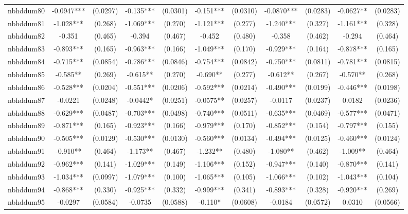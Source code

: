 \documentclass[]{article}
\begin{document}
\begin{tabular}{lcccccccccc}
nbhddum80 & -0.0947*** & (0.0297) & -0.135*** & (0.0301) & -0.151*** & (0.0310) & -0.0870*** & (0.0283) & -0.0627** & (0.0283) \\
nbhddum81 & -1.028*** & (0.268) & -1.069*** & (0.270) & -1.121*** & (0.277) & -1.240*** & (0.327) & -1.161*** & (0.328) \\
nbhddum82 & -0.351 & (0.465) & -0.394 & (0.467) & -0.452 & (0.480) & -0.358 & (0.462) & -0.294 & (0.464) \\
nbhddum83 & -0.893*** & (0.165) & -0.963*** & (0.166) & -1.049*** & (0.170) & -0.929*** & (0.164) & -0.878*** & (0.165) \\
nbhddum84 & -0.715*** & (0.0854) & -0.786*** & (0.0846) & -0.754*** & (0.0842) & -0.750*** & (0.0811) & -0.781*** & (0.0815) \\
nbhddum85 & -0.585** & (0.269) & -0.615** & (0.270) & -0.690** & (0.277) & -0.612** & (0.267) & -0.570** & (0.268) \\
nbhddum86 & -0.528*** & (0.0204) & -0.551*** & (0.0206) & -0.592*** & (0.0214) & -0.490*** & (0.0199) & -0.446*** & (0.0198) \\
nbhddum87 & -0.0221 & (0.0248) & -0.0442* & (0.0251) & -0.0575** & (0.0257) & -0.0117 & (0.0237) & 0.0182 & (0.0236) \\
nbhddum88 & -0.629*** & (0.0487) & -0.703*** & (0.0498) & -0.740*** & (0.0511) & -0.635*** & (0.0469) & -0.577*** & (0.0471) \\
nbhddum89 & -0.871*** & (0.165) & -0.923*** & (0.166) & -0.979*** & (0.170) & -0.852*** & (0.154) & -0.797*** & (0.155) \\
nbhddum90 & -0.505*** & (0.0129) & -0.530*** & (0.0130) & -0.560*** & (0.0134) & -0.494*** & (0.0125) & -0.460*** & (0.0124) \\
nbhddum91 & -0.910** & (0.464) & -1.173** & (0.467) & -1.232** & (0.480) & -1.080** & (0.462) & -1.009** & (0.464) \\
nbhddum92 & -0.962*** & (0.141) & -1.029*** & (0.149) & -1.106*** & (0.152) & -0.947*** & (0.140) & -0.870*** & (0.141) \\
nbhddum93 & -1.034*** & (0.0997) & -1.079*** & (0.100) & -1.065*** & (0.105) & -1.066*** & (0.102) & -1.043*** & (0.104) \\
nbhddum94 & -0.868*** & (0.330) & -0.925*** & (0.332) & -0.999*** & (0.341) & -0.893*** & (0.328) & -0.920*** & (0.269) \\
nbhddum95 & -0.0297 & (0.0584) & -0.0735 & (0.0588) & -0.110* & (0.0608) & -0.0184 & (0.0572) & 0.0310 & (0.0566) \\

\end{tabular}
\end{document}
